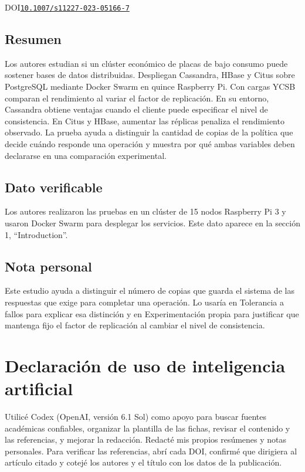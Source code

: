 \documentclass[11pt,a4paper,onecolumn]{article}
\begin{document}
\noindent\cite{da_silva_evaluation_2023}\enspace{}

\noindent DOI\enspace\href{https://doi.org/10.1007/s11227-023-05166-7}{\nolinkurl{10.1007/s11227-023-05166-7}}

\subsection*{Resumen}

Los autores estudian si un clúster económico de placas de bajo consumo puede sostener bases de datos distribuidas. Despliegan Cassandra, HBase y Citus sobre PostgreSQL mediante Docker Swarm en quince Raspberry Pi. Con cargas YCSB comparan el rendimiento al variar el factor de replicación. En su entorno, Cassandra obtiene ventajas cuando el cliente puede especificar el nivel de consistencia. En Citus y HBase, aumentar las réplicas penaliza el rendimiento observado. La prueba ayuda a distinguir la cantidad de copias de la política que decide cuándo responde una operación y muestra por qué ambas variables deben declararse en una comparación experimental.

\subsection*{Dato verificable}

Los autores realizaron las pruebas en un clúster de 15 nodos Raspberry Pi 3 y usaron Docker Swarm para desplegar los servicios. Este dato aparece en la sección 1, “Introduction”.

\subsection*{Nota personal}

Este estudio ayuda a distinguir el número de copias que guarda el sistema de las respuestas que exige para completar una operación. Lo usaría en Tolerancia a fallos para explicar esa distinción y en Experimentación propia para justificar que mantenga fijo el factor de replicación al cambiar el nivel de consistencia.

\section*{Declaración de uso de inteligencia artificial}

Utilicé Codex (OpenAI, versión 6.1 Sol) como apoyo para buscar fuentes académicas confiables, organizar la plantilla de las fichas, revisar el contenido y las referencias, y mejorar la redacción. Redacté mis propios resúmenes y notas personales. Para verificar las referencias, abrí cada DOI, confirmé que dirigiera al artículo citado y cotejé los autores y el título con los datos de la publicación.

\printbibliography[title={Referencias}]
\end{document}
